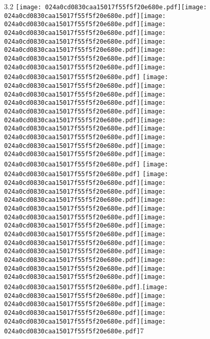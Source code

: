 \documentclass{article}
\newcommand{\origpg}[2]{\texttt{[image: 024a0cd0830caa15017f55f5f20e680e.pdf]}}
\begin{document}
{\vspace{0.656pt}\hspace{36.161pt}3.2 \origpg2{145.74pt 547.95pt 157.39pt 564.09pt}\origpg2{157.3pt 547.95pt 165.51pt 564.09pt}\hspace{-0.258pt}\origpg2{165.25pt 547.95pt 173.32pt 564.09pt}\origpg2{173.42pt 547.95pt 180.59pt 564.09pt}\origpg2{180.63pt 547.95pt 188.85pt 564.09pt}\origpg2{188.85pt 547.95pt 196.92pt 564.09pt}\hspace{-0.387pt}\origpg2{196.53pt 547.95pt 203.59pt 564.09pt}\origpg2{203.52pt 547.95pt 211.37pt 564.09pt}\hspace{-0.371pt}\origpg2{210.99pt 547.95pt 218.16pt 564.09pt} \origpg2{222.29pt 547.95pt 229.46pt 564.09pt}\origpg2{229.51pt 547.95pt 237.58pt 564.09pt}\hspace{-0.839pt}\origpg2{236.74pt 547.95pt 244.81pt 564.09pt}\hspace{-1.324pt}\origpg2{243.48pt 547.95pt 251.7pt 564.09pt}\origpg2{251.7pt 547.95pt 258.87pt 564.09pt}\origpg2{258.87pt 547.95pt 266.94pt 564.09pt}\hspace{0.145pt}\origpg2{267.08pt 547.95pt 274.25pt 564.09pt}\hspace{-0.178pt}\origpg2{274.07pt 547.95pt 282.71pt 564.09pt}\origpg2{282.71pt 547.95pt 291.34pt 564.09pt}\origpg2{291.4pt 547.95pt 300.04pt 564.09pt} \origpg2{303.93pt 547.95pt 311.55pt 564.09pt} \origpg2{315.49pt 547.95pt 324.12pt 564.09pt}\origpg2{324.12pt 547.95pt 332.19pt 564.09pt}\hspace{0.145pt}\origpg2{332.34pt 547.95pt 340.41pt 564.09pt}\hspace{-0.113pt}\origpg2{340.29pt 547.95pt 346.91pt 564.09pt}\hspace{-0.113pt}\origpg2{346.8pt 547.95pt 354.87pt 564.09pt}\hspace{-0.113pt}\origpg2{354.76pt 547.95pt 361.92pt 564.09pt}\hspace{-0.178pt}\origpg2{361.74pt 547.95pt 371.96pt 564.09pt}\origpg2{371.86pt 547.95pt 382.08pt 564.09pt}\origpg2{381.98pt 547.95pt 389.15pt 564.09pt}\origpg2{389.19pt 547.95pt 405.33pt 564.09pt}\origpg2{405.33pt 547.95pt 421.47pt 564.09pt}\origpg2{421.47pt 547.95pt 437.61pt 564.09pt}\origpg2{437.61pt 547.95pt 453.76pt 564.09pt}.\origpg2{457.88pt 547.95pt 474.02pt 564.09pt}\origpg2{474.02pt 547.95pt 490.16pt 564.09pt}\hspace{-0.242pt}\origpg2{489.92pt 547.95pt 506.06pt 564.09pt}\origpg2{506.06pt 547.95pt 522.2pt 564.09pt}\origpg2{522.22pt 547.95pt 538.36pt 564.09pt}\hspace{-0.211pt}7  

}
\end{document}

